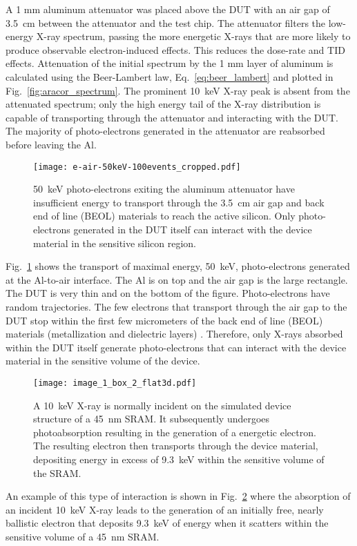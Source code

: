 A 1 mm aluminum attenuator was placed above the DUT with an air gap of 3.5~cm between the attenuator and the test chip.
The attenuator filters the low-energy X-ray spectrum, passing the more energetic X-rays that are more likely to produce observable electron-induced effects. 
This reduces the dose-rate and TID effects. 
Attenuation of the initial spectrum by the 1 mm layer of aluminum is calculated using the Beer-Lambert law, Eq.~\ref{eq:beer_lambert} and plotted in Fig.~\ref{fig:aracor_spectrum}.
The prominent 10~keV X-ray peak is absent from the attenuated spectrum; only the high energy tail of the X-ray distribution is capable of transporting through the attenuator and interacting with the DUT.
The majority of photo-electrons generated in the attenuator are reabsorbed before leaving the Al.

\begin{figure}[tb]
    \begin{center}
        \texttt{[image: e-air-50keV-100events\_cropped.pdf]}
    \end{center}
    \caption{50~keV photo-electrons exiting the aluminum attenuator have insufficient energy to transport through the 3.5~cm air gap and back end of line (BEOL) materials to reach the active silicon. Only photo-electrons generated in the DUT itself can interact with the device material in the sensitive silicon region.}
    \label{fig:air_gap}
\end{figure}

Fig.~\ref{fig:air_gap} shows the transport of maximal energy, 50~keV, photo-electrons generated at the Al-to-air interface. 
The Al is on top and the air gap is the large rectangle.
The DUT is very thin and on the bottom of the figure.
Photo-electrons have random trajectories. 
The few electrons that transport through the air gap to the DUT stop within the first few micrometers of the back end of line (BEOL) materials (metallization and dielectric layers) \cite{Dasgupta:2011mg}.
Therefore, only X-rays absorbed within the DUT itself generate photo-electrons that can interact with the device material in the sensitive volume of the device.
\begin{figure}[tb]
    \centering
        \texttt{[image: image\_1\_box\_2\_flat3d.pdf]}
        \caption{A 10~keV X-ray is normally incident on the simulated device structure of a 45~nm SRAM. It subsequently undergoes photoabsorption resulting in the generation of a energetic electron. The resulting electron then transports through the device material, depositing energy in excess of 9.3~keV within the sensitive volume of the SRAM.}
        \label{fig:photoabsorption_opendx}
\end{figure}
An example of this type of interaction is shown in Fig.~\ref{fig:photoabsorption_opendx} where the absorption of an incident 10~keV X-ray leads to the generation of an initially free, nearly ballistic electron that deposits 9.3~keV of energy when it scatters within the sensitive volume of a 45~nm SRAM.

